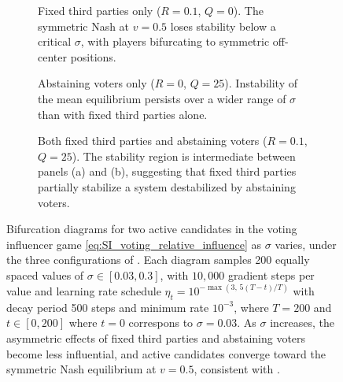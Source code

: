 \documentclass{article}
\begin{document}
        \begin{figure}[htbp]
            \centering
            \begin{subfigure}[b]{0.3\linewidth}
                \centering
                
                \caption{Fixed third parties only ($R=0.1$, $Q=0$).
                    The symmetric Nash at $v=0.5$ loses stability below a critical $\sigma$, with players bifurcating to symmetric off-center positions.}
                \label{fig:voting_bifurcation:a}
                \vspace{4ex}
            \end{subfigure}
            \begin{subfigure}[b]{0.3\linewidth}
                \centering
                
                \caption{Abstaining voters only ($R=0$, $Q=25$).
                    Instability of the mean equilibrium persists over a wider range of $\sigma$ than with fixed third parties alone.}
                \label{fig:voting_bifurcation:b}
                \vspace{4ex}
            \end{subfigure}
            \begin{subfigure}[b]{0.3\linewidth}
                \centering
                
                \caption{Both fixed third parties and abstaining voters ($R=0.1$, $Q=25$).
                    The stability region is intermediate between panels (a) and (b), suggesting that fixed third parties partially stabilize a system destabilized by abstaining voters.}
                \label{fig:voting_bifurcation:c}
                \vspace{4ex}
            \end{subfigure}

            \caption{Bifurcation diagrams for two active candidates in the voting influencer game \cref{eq:SI_voting_relative_influence} as $\sigma$ varies, under the three configurations of .
                Each diagram samples 200 equally spaced values of $\sigma \in [0.03, 0.3]$, with $10{,}000$ gradient steps per value and learning rate schedule $\eta_t = 10^{-\max(3,\,5(T-t)/T)}$ with decay period 500 steps and minimum rate $10^{-3}$, where $T = 200$ and $t\in[0,200]$ where $t=0$ correspons to $\sigma=0.03$.
                As $\sigma$ increases, the asymmetric effects of fixed third parties and abstaining voters become less influential, and active candidates converge toward the symmetric Nash equilibrium at $v = 0.5$, consistent with .}
            \label{fig:voting_bifurcation}
        \end{figure}
\end{document}
